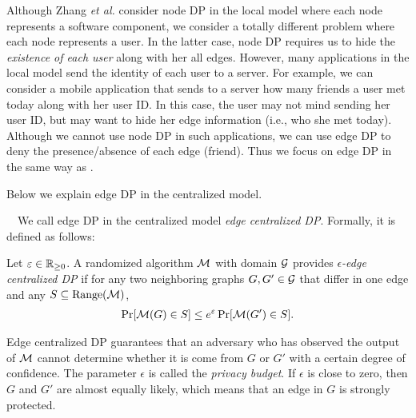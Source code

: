 Although Zhang \textit{et al.} \cite{Zhang_USENIX20} consider node DP in the local model where each node represents a software component, we consider a totally different problem where each node represents a user. 
In the latter case, 
node DP requires us to hide the \textit{existence of each user} along with her all edges. 
However, many applications in the local model send the identity of each user to a server. 
For example, 
we can consider a mobile application 
that sends to a server how many friends a user met today along with her user ID. 
In this case, the user may not mind sending her user ID, 
but may want to hide her edge information (i.e., who she met today). 
Although we cannot use node DP in such applications, we can use edge DP to deny the presence/absence of each edge (friend). 
Thus we focus on edge DP in the same way as \cite{qin2017generating,Sun_CCS19,Ye_ICDE20,Ye_TKDE21}. 

Below we explain edge DP in the centralized model. 

\smallskip
{}~~We call edge DP in the centralized model \textit{edge centralized DP}. 
Formally, it is defined as follows:

\begin{definition}  \label{chap1-def:edge_CDP} 
Let $\varepsilon \in \mathbb{R}_{\ge0}$. 
A randomized algorithm $\mathcal{M}$ with domain $\mathcal{G}$ provides \emph{$\epsilon$-edge centralized DP} 
if for any two 
neighboring 
graphs $G, G' \in \mathcal{G}$ that differ in one edge and any $S \subseteq \mathrm{Range}(\mathcal{M})$, 
\begin{align}
\Pr[\mathcal{M}(G) \in S] \leq e^\varepsilon \Pr[\mathcal{M}(G') \in S].
\label{chap1-eq:edge_CDP}
\end{align}
\end{definition}
Edge centralized DP guarantees that an adversary who has observed the output of $\mathcal{M}$ cannot determine whether it is come from $G$ or $G'$ with a certain degree of confidence. 
The parameter $\epsilon$ is called the \textit{privacy budget}. 
If $\epsilon$ is close to zero, then $G$ and $G'$ are almost equally likely, which means that an edge in $G$ is strongly protected. 

